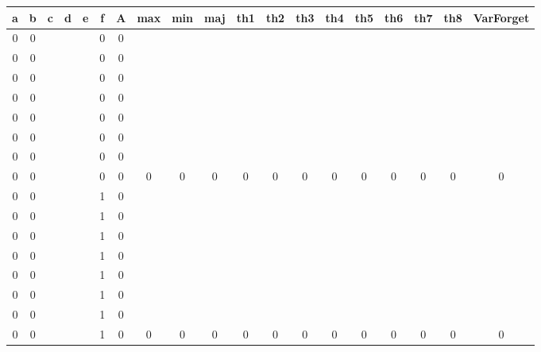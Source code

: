 \begin{table}[!tb]
    \centering
    \begin{tabular}{|c|c|c|c|c|c|c|c|c|c|c|c|c|c|c|c|c|c|c|}
        \hline
        \textbf{a} & \textbf{b} & \textbf{c} & \textbf{d} & \textbf{e} & \textbf{f} & \textbf{A} & \textbf{max} & \textbf{min} & \textbf{maj} & \textbf{th1} & \textbf{th2} & \textbf{th3} & \textbf{th4} & \textbf{th5} & \textbf{th6} & \textbf{th7} & \textbf{th8} & \textbf{VarForget} \\ \hline
        \rowcolor{gray!40} 0 & 0 &  &  &  & 0 & 0 &  &  &  &  &  &  &  &  &  &  &  &  \\ \hline
        \rowcolor{gray!40} 0 & 0 &  &  &  & 0 & 0 &  &  &  &  &  &  &  &  &  &  &  &  \\ \hline
        \rowcolor{gray!40} 0 & 0 &  &  &  & 0 & 0 &  &  &  &  &  &  &  &  &  &  &  &  \\ \hline
        \rowcolor{gray!40} 0 & 0 &  &  &  & 0 & 0 &  &  &  &  &  &  &  &  &  &  &  &  \\ \hline
        \rowcolor{gray!40} 0 & 0 &  &  &  & 0 & 0 &  &  &  &  &  &  &  &  &  &  &  &  \\ \hline
        \rowcolor{gray!40} 0 & 0 &  &  &  & 0 & 0 &  &  &  &  &  &  &  &  &  &  &  &  \\ \hline
        \rowcolor{gray!40} 0 & 0 &  &  &  & 0 & 0 &  &  &  &  &  &  &  &  &  &  &  &  \\ \hline
        \rowcolor{gray!40} 0 & 0 &  &  &  & 0 & 0 & 0 & 0 & 0 & 0 & 0 & 0 & 0 & 0 & 0 & 0 & 0 & 0 \\ \hline
        \rowcolor{blue!40} 0 & 0 &  &  &  & 1 & 0 &  &  &  &  &  &  &  &  &  &  &  &  \\ \hline
        \rowcolor{blue!40} 0 & 0 &  &  &  & 1 & 0 &  &  &  &  &  &  &  &  &  &  &  &  \\ \hline
        \rowcolor{blue!40} 0 & 0 &  &  &  & 1 & 0 &  &  &  &  &  &  &  &  &  &  &  &  \\ \hline
        \rowcolor{blue!40} 0 & 0 &  &  &  & 1 & 0 &  &  &  &  &  &  &  &  &  &  &  &  \\ \hline
        \rowcolor{blue!40} 0 & 0 &  &  &  & 1 & 0 &  &  &  &  &  &  &  &  &  &  &  &  \\ \hline
        \rowcolor{blue!40} 0 & 0 &  &  &  & 1 & 0 &  &  &  &  &  &  &  &  &  &  &  &  \\ \hline
        \rowcolor{blue!40} 0 & 0 &  &  &  & 1 & 0 &  &  &  &  &  &  &  &  &  &  &  &  \\ \hline
        \rowcolor{blue!40} 0 & 0 &  &  &  & 1 & 0 & 0 & 0 & 0 & 0 & 0 & 0 & 0 & 0 & 0 & 0 & 0 & 0 \\ \hline

\end{tabular}
\end{table}
